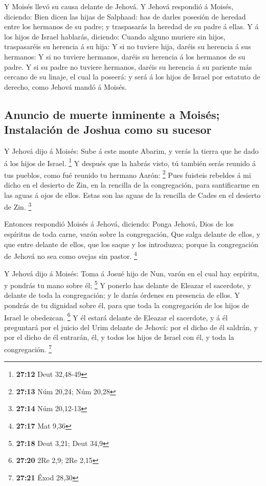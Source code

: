  Y Moisés llevó su causa delante de Jehová.  Y
Jehová respondió á Moisés, diciendo:  Bien dicen las hijas
de Salphaad: has de darles posesión de heredad entre los hermanos de su
padre; y traspasarás la heredad de su padre á ellas.  Y á
los hijos de Israel hablarás, diciendo: Cuando alguno muriere sin hijos,
traspasaréis su herencia á su hija:  Y si no tuviere hija,
daréis su herencia á sus hermanos:  Y si no tuviere
hermanos, daréis su herencia á los hermanos de su padre.  Y
si su padre no tuviere hermanos, daréis su herencia á su pariente más
cercano de su linaje, el cual la poseerá: y será á los hijos de Israel
por estatuto de derecho, como Jehová mandó á Moisés.

\hypertarget{anuncio-de-muerte-inminente-a-moisuxe9s-instalaciuxf3n-de-joshua-como-su-sucesor}{%
\subsection{Anuncio de muerte inminente a Moisés; Instalación de Joshua
como su
sucesor}\label{anuncio-de-muerte-inminente-a-moisuxe9s-instalaciuxf3n-de-joshua-como-su-sucesor}}

 Y Jehová dijo á Moisés: Sube á este monte Abarim, y verás
la tierra que he dado á los hijos de Israel. \footnote{\textbf{27:12}
  Deut 32,48-49}  Y después que la habrás visto, tú también
serás reunido á tus pueblos, como fué reunido tu hermano Aarón:
\footnote{\textbf{27:13} Núm 20,24; Núm 20,28}  Pues
fuisteis rebeldes á mi dicho en el desierto de Zin, en la rencilla de la
congregación, para santificarme en las aguas á ojos de ellos. Estas son
las aguas de la rencilla de Cades en el desierto de Zin. \footnote{\textbf{27:14}
  Núm 20,12-13}

 Entonces respondió Moisés á Jehová, diciendo:
 Ponga Jehová, Dios de los espíritus de toda carne, varón
sobre la congregación,  Que salga delante de ellos, y que
entre delante de ellos, que los saque y los introduzca; porque la
congregación de Jehová no sea como ovejas sin pastor. \footnote{\textbf{27:17}
  Mat 9,36}

 Y Jehová dijo á Moisés: Toma á Josué hijo de Nun, varón en
el cual hay espíritu, y pondrás tu mano sobre él; \footnote{\textbf{27:18}
  Deut 3,21; Deut 34,9}  Y ponerlo has delante de Eleazar
el sacerdote, y delante de toda la congregación; y le darás órdenes en
presencia de ellos.  Y pondrás de tu dignidad sobre él,
para que toda la congregación de los hijos de Israel le obedezcan.
\footnote{\textbf{27:20} 2Re 2,9; 2Re 2,15}  Y él estará
delante de Eleazar el sacerdote, y á él preguntará por el juicio del
Urim delante de Jehová: por el dicho de él saldrán, y por el dicho de él
entrarán, él, y todos los hijos de Israel con él, y toda la
congregación. \footnote{\textbf{27:21} Éxod 28,30}

